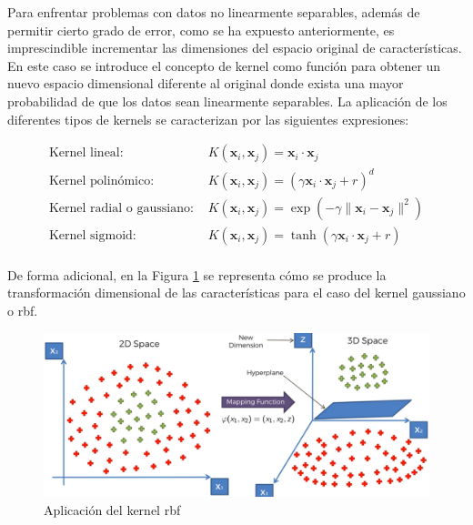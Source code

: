 \vspace{3mm}

Para enfrentar problemas con datos no linearmente separables, además de permitir cierto grado de error, como se ha expuesto anteriormente, es imprescindible incrementar las dimensiones del espacio original de características. En este caso se introduce el concepto de kernel como función para obtener un nuevo espacio dimensional diferente al original donde exista una mayor probabilidad de que los datos sean linearmente separables. La aplicación de los diferentes tipos de kernels se caracterizan por las siguientes expresiones:~\cite{svmciencia}~\cite{velocity}

\[\begin{array}{ll}
    \text{Kernel lineal: } & K(\mathbf{x}_i, \mathbf{x}_j) = \mathbf{x}_i \cdot \mathbf{x}_j\\
    \text{Kernel polinómico: } & K(\mathbf{x}_i, \mathbf{x}_j) = (\gamma \mathbf{x}_i \cdot \mathbf{x}_j + r)^d\\
    \text{Kernel radial o gaussiano: } & K(\mathbf{x}_i, \mathbf{x}_j) = \exp \left( -\gamma \| \mathbf{x}_i - \mathbf{x}_j \|^2 \right)\\
    \text{Kernel sigmoid: } & K(\mathbf{x}_i, \mathbf{x}_j) = \tanh(\gamma \mathbf{x}_i \cdot \mathbf{x}_j + r)\\
\end{array}\]

\vspace{3mm}

De forma adicional, en la Figura \ref{fig:rbf} se representa cómo se produce la transformación dimensional de las características para el caso del kernel gaussiano o \gls{rbf}.

\vspace{3mm}

\begin{figure}[h!]
    \centering
    \includegraphics[width=1\textwidth]{img/teoria/rbf.png}
    \caption{Aplicación del kernel \acrshort{rbf} \cite{rbf}}
    \label{fig:rbf}
\end{figure}


